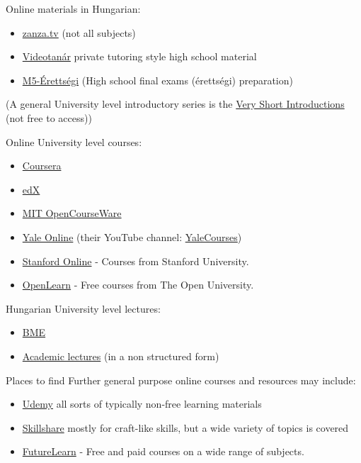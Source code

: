 \documentclass{article}
\begin{document}
Online materials in Hungarian:
\begin{itemize}
    \item \href{https://zanza.tv/}{zanza.tv} (not all subjects)
    \item \href{https://www.youtube.com/user/videotanar/}{Videotanár} private tutoring style high school material
    \item \href{https://www.youtube.com/playlist?list=PLEiwVd6n_Q_38BxQQDqYZE6bdMQAZxbX2}{M5-Érettségi} (High school final exams (érettségi) preparation)
\end{itemize}

(A general University level introductory series is the \href{https://www.veryshortintroductions.com/browse}{Very Short Introductions} (not free to access))

Online University level courses:
\begin{itemize}
    \item \href{https://www.coursera.org/}{Coursera}
    \item \href{https://www.edx.org/}{edX}
    \item \href{https://ocw.mit.edu/index.htm}{MIT OpenCourseWare}
    \item \href{https://online.yale.edu/courses}{Yale Online} (their YouTube channel: \href{https://www.youtube.com/user/YaleCourses}{YaleCourses})
    \item \href{https://online.stanford.edu/free-courses}{Stanford Online} - Courses from Stanford University.
    \item \href{https://www.open.edu/openlearn/free-courses}{OpenLearn} - Free courses from The Open University.
\end{itemize}

Hungarian University level lectures:
\begin{itemize}
    \item \href{https://bme.videotorium.hu/}{BME}
    \item \href{http://videotorium.hu/}{Academic lectures} (in a non structured form)
\end{itemize}

Places to find Further general purpose online courses and resources may include:

\begin{itemize}
    \item \href{https://www.udemy.com/}{Udemy} all sorts of typically non-free learning materials
    \item \href{https://www.skillshare.com/en/}{Skillshare} mostly for craft-like skills, but a wide variety of topics is covered
    \item \href{https://www.futurelearn.com/}{FutureLearn} - Free and paid courses on a wide range of subjects.
\end{itemize}
\end{document}
